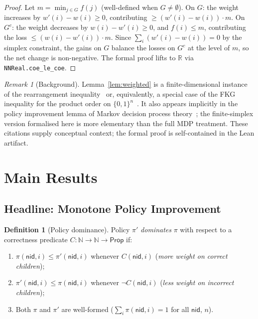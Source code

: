 \documentclass[reqno,11pt]{amsart}
\newcommand{\NN}{\mathbb{N}}
\newcommand{\RR}{\mathbb{R}}
\newcommand{\nid}{\mathsf{nid}}
\theoremstyle{plain}
\theoremstyle{definition}
\newtheorem{definition}[theorem]{Definition}
\theoremstyle{remark}
\newtheorem{remark}[theorem]{Remark}
\begin{document}
\begin{proof}
Let $m = \min_{j \in G} f(j)$ (well-defined when $G \ne \emptyset$). On $G$: the weight increases by $w'(i) - w(i) \ge 0$, contributing $\ge (w'(i)-w(i)) \cdot m$. On $G^c$: the weight decreases by $w(i)-w'(i) \ge 0$, and $f(i) \le m$, contributing the loss $\le (w(i)-w'(i)) \cdot m$. Since $\sum_i (w'(i)-w(i)) = 0$ by the simplex constraint, the gains on $G$ balance the losses on $G^c$ at the level of $m$, so the net change is non-negative. The formal proof lifts to $\RR$ via \texttt{NNReal.coe\_le\_coe}.
\end{proof}

\begin{remark}[Background]
Lemma~\ref{lem:weighted} is a finite-dimensional instance of the rearrangement inequality~\citep{HardyLittlewoodPolya1952} or, equivalently, a special case of the FKG inequality for the product order on $\{0,1\}^n$~\citep{FKG1971}. It also appears implicitly in the policy improvement lemma of Markov decision process theory~\citep[Chapter~6]{Puterman1994}; the finite-simplex version formalised here is more elementary than the full MDP treatment. These citations supply conceptual context; the formal proof is self-contained in the Lean artifact.
\end{remark}

\section{Main Results}

\subsection{Headline: Monotone Policy Improvement}

\begin{definition}[Policy dominance]
Policy $\pi'$ \emph{dominates} $\pi$ with respect to a correctness predicate $C : \NN \to \NN \to \mathsf{Prop}$ if:
\begin{enumerate}[leftmargin=*]
\item $\pi(\nid, i) \le \pi'(\nid, i)$ whenever $C(\nid, i)$ (\emph{more weight on correct children});
\item $\pi'(\nid, i) \le \pi(\nid, i)$ whenever $\neg C(\nid, i)$ (\emph{less weight on incorrect children});
\item Both $\pi$ and $\pi'$ are well-formed ($\sum_i \pi(\nid, i) = 1$ for all $\nid$, $n$).
\end{enumerate}
\end{definition}
\end{document}
